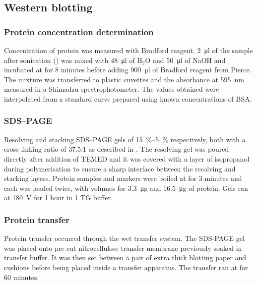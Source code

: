     \subsection{Western blotting}
      \subsubsection{Protein concentration determination}
        Concentration of protein was measured with Bradford reagent.
        \SI{2}{\ul} of the sample after sonication ()
        was mixed with \SI{48}{\ul} of H$_2$O and \SI{50}{\ul} of NaOH and
        incubated at  for 8 minutes before adding \SI{900}{\ul} of
        Bradford reagent from Pierce. The mixture was transferred to plastic
        cuvettes and the absorbance at \SI{595}{\nm} measured in a Shimadzu
        spectrophotometer. The values obtained were interpolated from a
        standard curve prepared using known concentrations of BSA.

      \subsubsection{SDS--PAGE}
        Resolving and stacking SDS--PAGE gels of \SIrange{15}{5}{\percent}
        respectively, both with a cross-linking ratio of \num{37.5}:1 as
        described in \citet{harlow_electrophoresis_1988}. The
        resolving gel was poured directly after addition
        of TEMED and it was covered with a layer of isopropanol during polymerisation
        to ensure a sharp interface between the resolving and stacking layers.
        Protein samples and markers were boiled at  for 3 minutes and each
        was loaded twice, with volumes for \SI{3.3}{\ug} and \SI{16.5}{\ug} of
        protein. Gels ran at \SI{180}{\volt} for 1 hour in \SI{1}{\X} TG buffer.

      \subsubsection{Protein transfer}
        Protein transfer occurred through the wet transfer system. The
        SDS-PAGE gel was placed onto pre-cut nitrocellulose transfer membrane
        previously soaked in transfer buffer. It was then set between a pair
        of extra thick blotting paper and cushions before being placed inside
        a transfer apparatus. The transfer ran at  for 60 minutes.

